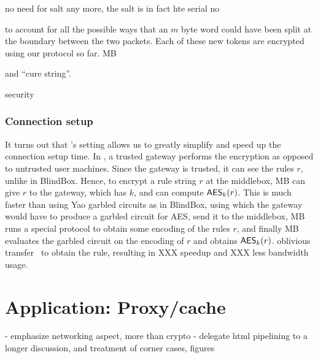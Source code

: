 \begin{framed}
\begin{algorithmic}[1]
	\State {}
\EndProcedure
\end{algorithmic}
\end{framed}

no need for salt any more, the salt is in fact hte serial no

 
 
  to account 
 for all the possible ways that an $m$ byte word could have been split at the boundary between the two packets.
 Each of these new tokens are encrypted using our protocol so far.
 MB 
 
 and ``cure string''.
 
 security

 
 \subsubsection{Connection setup}
 
 It turns out that \sys's setting allows us to greatly simplify and speed up the connection setup time. In \sys, a trusted gateway performs the encryption as opposed to untrusted user machines. Since the gateway is trusted, it can see the rules $r$, unlike in BlindBox. Hence, 
to encrypt a rule string $r$ at the middlebox, MB can give $r$ to the gateway, which has $k$, and can compute $\mathsf{AES}_k(r)$. This is much faster than using Yao garbled circuits as in BlindBox, using which the gateway would have to produce a garbled circuit for AES, send it to the middlebox, MB runs a special protocol to obtain some encoding of the rules $r$, and finally MB evaluates the garbled circuit on the encoding of $r$ and obtains $\mathsf{AES}_k(r)$. oblivious transfer~\cite{} to obtain the rule, resulting in XXX speedup and XXX less bandwidth usage. 





\section{Application: Proxy/cache}\label{sec:proxy}


- emphasize networking aspect, more than crypto
- delegate html pipelining to a longer discussion, and treatment of corner cases, figures

